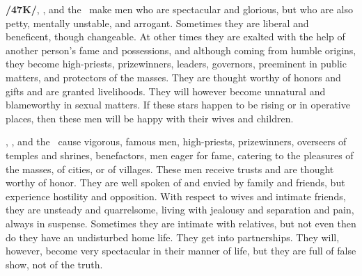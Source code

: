 \textbf{/47K/}\Jupiter, \Venus, and the \Sun\, make men who are spectacular and glorious, but who are also petty, mentally unstable, and arrogant. Sometimes they are liberal and beneficent, though changeable. At other times they are exalted with the help of another person’s fame and possessions, and although coming from humble origins, they become high-priests, prizewinners, leaders, governors, preeminent in public matters, and protectors of the masses. They are thought worthy of honors and gifts and are granted livelihoods. They will however become unnatural and blameworthy in sexual matters. If these stars happen to be rising or in operative places, then these men will be happy with their wives and children.

\Jupiter, \Venus, and the \Moon\, cause vigorous, famous men, high-priests, prizewinners, overseers of temples and shrines, benefactors, men eager for fame, catering to the pleasures of the masses, of cities, or of villages. These men receive trusts and are thought worthy of honor. They are well spoken of and envied by family and friends, but experience hostility and opposition. With respect to wives and intimate friends, they are unsteady and quarrelsome, living with jealousy and separation and pain, always in suspense. Sometimes they are intimate with relatives, but not even then do they have an undisturbed home life. They get into partnerships. They will, however, become very spectacular in their manner of life, but they are full of false show, not of the truth.

\secbr
